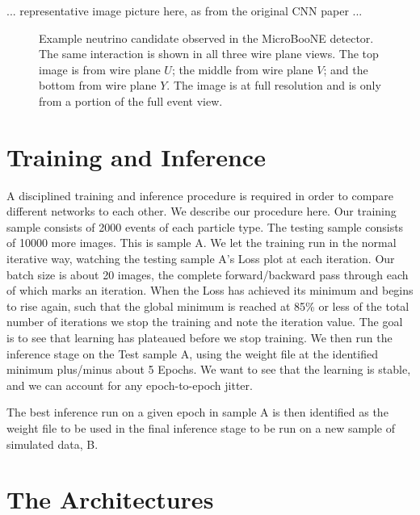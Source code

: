 \documentclass[11pt,a4paper]{article}
\begin{document}
... representative image picture here, as from the original CNN paper ...

\begin{figure}[t]
  \centering  
\caption{Example neutrino candidate observed in the MicroBooNE detector.  The same interaction is shown in all three wire plane views.  The top image is from wire plane $U$; the middle from wire plane $V$; and the bottom from wire plane $Y$. The image is at full resolution and is only from a portion of the full event view.}
  \label{fig:UBEVD}
\end{figure}


\section {Training and Inference}

A disciplined training and inference procedure is required in order to compare different networks to each other. We describe our procedure here. Our training sample consists of 2000 events of each particle type. The testing sample consists of 10000 more images. This is sample A. We let the training run in the normal iterative way, watching the testing sample A's Loss plot at each iteration. Our batch size is about 20 images, the complete forward/backward pass through each of which marks an iteration. When the Loss has achieved its minimum and begins to rise again, such that the global minimum is reached at 85\% or less of the total number of iterations we stop the training and note the iteration value. The goal is to see that learning has plateaued before we stop training. We then run the inference stage on the Test sample A, using the weight file at the identified minimum plus/minus about 5 Epochs. We want to see that the learning is stable, and we can account for any epoch-to-epoch jitter.

The best inference run on a given epoch in sample A is then identified as the weight file to be used in the final inference stage to be run on a new sample of simulated data, B.


\section {The Architectures}
\end{document}
